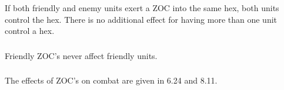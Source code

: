 \subsubsection[Competing ZOCs]{} If both friendly and enemy units exert a ZOC into the same hex, both units control the hex. There is no additional effect for having more than one unit control a hex.

\subsubsection[Friendly ZOCs]{} Friendly ZOC's never affect friendly units.

\subsubsection[ZOCs and Combat]{} The effects of ZOC's on combat are given in 6.24 and 8.11.